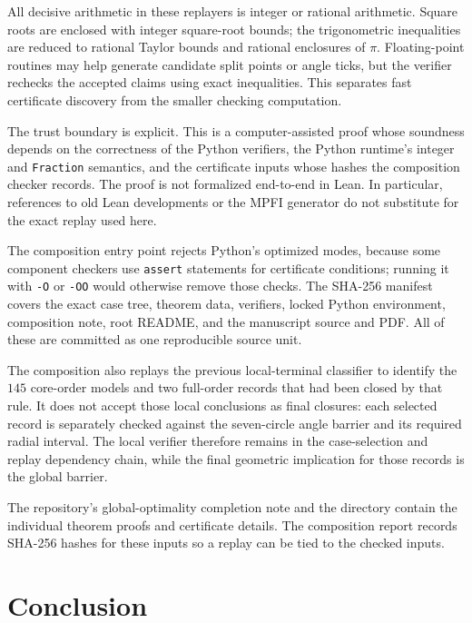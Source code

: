 \documentclass[11pt,a4paper]{article}
\theoremstyle{remark}
\begin{document}
All decisive arithmetic in these replayers is integer or rational arithmetic.
Square roots are enclosed with integer square-root bounds; the trigonometric
inequalities are reduced to rational Taylor bounds and rational enclosures of
$\pi$.  Floating-point routines may help generate candidate split points or
angle ticks, but the verifier rechecks the accepted claims using exact
inequalities.  This separates fast certificate discovery from the smaller
checking computation.

The trust boundary is explicit.  This is a computer-assisted proof whose
soundness depends on the correctness of the Python verifiers, the Python
runtime's integer and \texttt{Fraction} semantics, and the certificate inputs
whose hashes the composition checker records.  The proof is not formalized
end-to-end in Lean.  In particular, references to old Lean developments or
the MPFI generator do not substitute for the exact replay used here.

The composition entry point rejects Python's optimized modes, because some
component checkers use \texttt{assert} statements for certificate conditions;
running it with \texttt{-O} or \texttt{-OO} would otherwise remove those
checks.  The SHA-256 manifest covers the exact case tree, theorem data,
verifiers, locked Python environment, composition note, root README, and the
manuscript source and PDF.  All of these are committed as one reproducible
source unit.

The composition also replays the previous local-terminal classifier to
identify the $145$ core-order models and two full-order records that had been
closed by that rule.  It does not accept those local conclusions as final
closures: each selected record is separately checked against the seven-circle
angle barrier and its required radial interval.  The local verifier therefore
remains in the case-selection and replay dependency chain, while the final
geometric implication for those records is the global barrier.

The repository's global-optimality completion note and the
 directory contain the individual theorem
proofs and certificate details.  The composition report records SHA-256
hashes for these inputs so a replay can be tied to the checked inputs.

\section{Conclusion}
\end{document}
